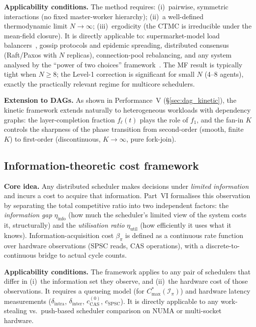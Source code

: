 \documentclass[11pt,a4paper]{article}
\begin{document}
\medskip
\noindent\textbf{Applicability conditions.}
The method requires:
(i)~pairwise, symmetric interactions (no fixed master-worker hierarchy);
(ii)~a well-defined thermodynamic limit $N \to \infty$;
(iii)~ergodicity (the CTMC is irreducible under the mean-field closure).
It is directly applicable to: supermarket-model load balancers~\cite{mitzenmacher2001,vvedenskaya1996},
gossip protocols and epidemic spreading, distributed consensus
(Raft/Paxos with $N$ replicas), connection-pool rebalancing,
and any system analysed by the ``power of two choices'' framework~\cite{azar1999}.
The MF result is typically tight when $N \geq 8$; the Level-1 correction
is significant for small $N$ (4--8 agents), exactly the practically
relevant regime for multicore schedulers.

\medskip
\noindent\textbf{Extension to DAGs.}
As shown in Performance~V (\S\ref{sec:dag_kinetic}), the kinetic framework
extends naturally to heterogeneous workloads with dependency graphs:
the layer-completion fraction $f_\ell(t)$ plays the role of $f_1$, and
the fan-in $K$ controls the sharpness of the phase transition from
second-order (smooth, finite $K$) to first-order (discontinuous,
$K \to \infty$, pure fork-join).

\subsection{Information-theoretic cost framework}

\medskip
\noindent\textbf{Core idea.}
Any distributed scheduler makes decisions under \emph{limited information}
and incurs a cost to acquire that information.  Part~VI formalises this
observation by separating the total competitive ratio into two independent
factors: the \emph{information gap} $\eta_{\mathrm{info}}$ (how much the
scheduler's limited view of the system costs it, structurally) and the
\emph{utilisation ratio} $\eta_{\mathrm{util}}$ (how efficiently it uses
what it knows).  Information-acquisition cost $\beta_\pi$ is defined as a
continuous rate function over hardware observations (SPSC reads, CAS
operations), with a discrete-to-continuous bridge to actual cycle counts.

\medskip
\noindent\textbf{Applicability conditions.}
The framework applies to any pair of schedulers that differ in
(i)~the information set they observe, and
(ii)~the hardware cost of those observations.
It requires a queueing model (for $C_{\max}^*(\mathcal{I}_\pi)$) and
hardware latency measurements ($\delta_{\mathrm{intra}}$,
$\delta_{\mathrm{inter}}$, $c_{\mathrm{CAS}}^{(0)}$, $c_{\mathrm{SPSC}}$).
It is directly applicable to any work-stealing vs.\ push-based scheduler
comparison on NUMA or multi-socket hardware.
\end{document}

